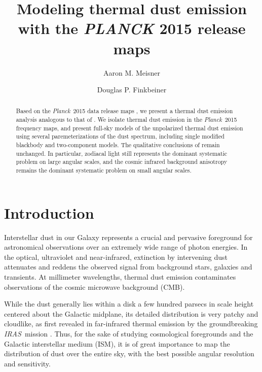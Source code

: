 \documentclass{emulateapj}
\newcommand{\IRAS}{{\it IRAS}}
\newcommand{\PLANCK}{{\it Planck}}
\begin{document}
\title{Modeling thermal dust emission with the {\it PLANCK} 2015 release maps}
\author{Aaron M. Meisner}
\author{Douglas P. Finkbeiner}

\begin{abstract}

Based on the \PLANCK~2015 data release maps \citep{planck2015}, we present a 
thermal dust emission analysis analogous to that of \cite{meisner15}. We 
isolate thermal dust emission in the \PLANCK~2015 frequency maps, and present 
full-sky models of the unpolarized thermal dust emission using several 
paremeterizations of the dust spectrum, including single modified blackbody and
two-component models. The qualitative conclusions of \cite{meisner15} remain 
unchanged. In particular, zodiacal light still represents the dominant 
systematic problem on large angular scales, and the cosmic infrared background 
anisotropy remains the dominant systematic problem on small angular scales.


\end{abstract}


\section{Introduction}
Interstellar dust in our Galaxy represents a crucial and pervasive foreground
for astronomical observations over an extremely wide range of photon energies.
In the optical, ultraviolet and near-infrared, extinction by intervening dust
attenuates and reddens the observed signal from background stars, galaxies and
transients. At millimeter wavelengths, thermal dust emission contaminates
observations of the cosmic microwave background (CMB).

While the dust generally lies within a disk a few hundred parsecs in scale 
height centered about the Galactic midplane, its detailed distribution is very 
patchy and cloudlike, as first revealed in far-infrared thermal emission by the
groundbreaking \IRAS~mission \citep{low84, wheelock94}. Thus, for the sake of 
studying cosmological foregrounds and the Galactic interstellar medium (ISM), 
it is of great importance to map the distribution of dust over the entire sky, 
with the best possible angular resolution and sensitivity.
\end{document}
